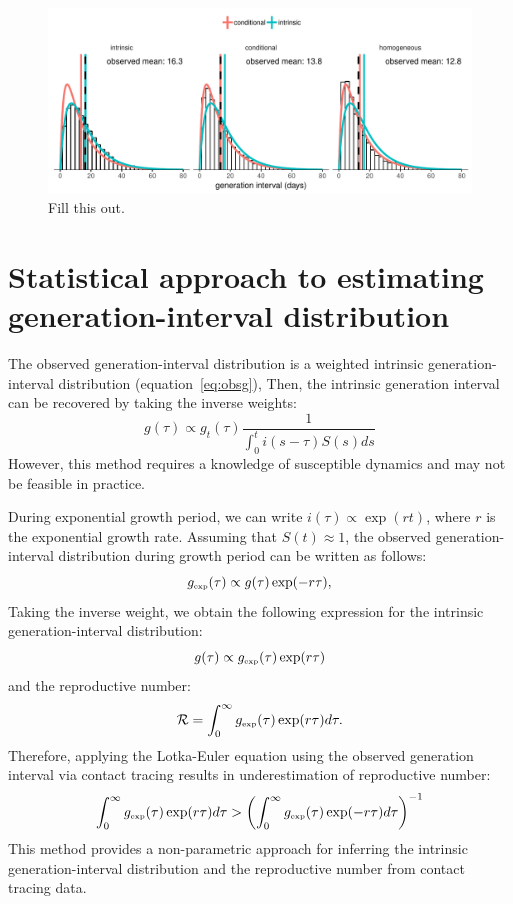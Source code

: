 \documentclass{article}
\newcommand{\RR}{\ensuremath{{\mathcal R}}}
\newcommand{\tsub}[2]{#1_{{\textrm{\tiny #2}}}}
\begin{document}
\begin{figure}
\includegraphics[width=\textwidth]{../analysis/local_effect.pdf}
\caption{Fill this out.}
\label{fig:local}
\end{figure}

\section{Statistical approach to estimating generation-interval distribution}

The observed generation-interval distribution is a weighted intrinsic generation-interval distribution (equation~\ref{eq:obsg}),
Then, the intrinsic generation interval can be recovered by taking the inverse weights:
\begin{equation}
g(\tau) \propto g_t(\tau) \frac{1}{\int_{0}^t i(s-\tau) S(s) ds}
\end{equation}
However, this method requires a knowledge of susceptible dynamics and may not be feasible in practice.

During exponential growth period, we can write $i(\tau) \propto \exp(r t)$, where $r$ is the exponential growth rate.
Assuming that $S(t) \approx 1$, the observed generation-interval distribution during growth period can be written as follows:
\begin{equation}
\tsub{g}{exp}(\tau) \propto g(\tau) \exp(-r\tau),
\end{equation}
Taking the inverse weight, we obtain the following expression for the intrinsic generation-interval distribution:
\begin{equation}
g(\tau) \propto \tsub{g}{exp}(\tau) \exp(r\tau)
\end{equation}
and the reproductive number:
\begin{equation}
\RR = \int_0^\infty \tsub{g}{exp}(\tau) \exp(r\tau) d\tau.
\end{equation}
Therefore, applying the Lotka-Euler equation using the observed generation interval via contact tracing results in underestimation of reproductive number:
\begin{equation}
\int_0^\infty \tsub{g}{exp}(\tau) \exp(r\tau) d\tau > \left(\int_0^\infty \tsub{g}{exp}(\tau) \exp(-r\tau) d\tau\right)^{-1}
\end{equation}
This method provides a non-parametric approach for inferring the intrinsic generation-interval distribution and the reproductive number from contact tracing data.
\end{document}

